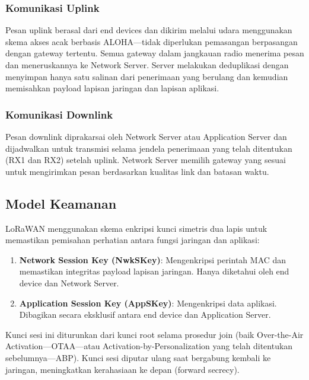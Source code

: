 \subsubsection{Komunikasi Uplink}
Pesan uplink berasal dari end devices dan dikirim melalui udara menggunakan skema akses acak berbasis ALOHA—tidak diperlukan pemasangan berpasangan dengan gateway tertentu. Semua gateway dalam jangkauan radio menerima pesan dan meneruskannya ke Network Server. Server melakukan deduplikasi dengan menyimpan hanya satu salinan dari penerimaan yang berulang dan kemudian memisahkan payload lapisan jaringan dan lapisan aplikasi.
\subsubsection{Komunikasi Downlink}
Pesan downlink diprakarsai oleh Network Server atau Application Server dan dijadwalkan untuk transmisi selama jendela penerimaan yang telah ditentukan (RX1 dan RX2) setelah uplink. Network Server memilih gateway yang sesuai untuk mengirimkan pesan berdasarkan kualitas link dan batasan waktu.
\subsection{Model Keamanan}
LoRaWAN menggunakan skema enkripsi kunci simetris dua lapis untuk memastikan pemisahan perhatian antara fungsi jaringan dan aplikasi:
\begin{enumerate}
    \item \textbf{Network Session Key (NwkSKey)}: Mengenkripsi perintah MAC dan memastikan integritas payload lapisan jaringan. Hanya diketahui oleh end device dan Network Server.
    \item \textbf{Application Session Key (AppSKey)}: Mengenkripsi data aplikasi. Dibagikan secara eksklusif antara end device dan Application Server.
\end{enumerate}
Kunci sesi ini diturunkan dari kunci root selama prosedur join (baik Over-the-Air Activation—OTAA—atau Activation-by-Personalization yang telah ditentukan sebelumnya—ABP). Kunci sesi diputar ulang saat bergabung kembali ke jaringan, meningkatkan kerahasiaan ke depan (forward secrecy).

